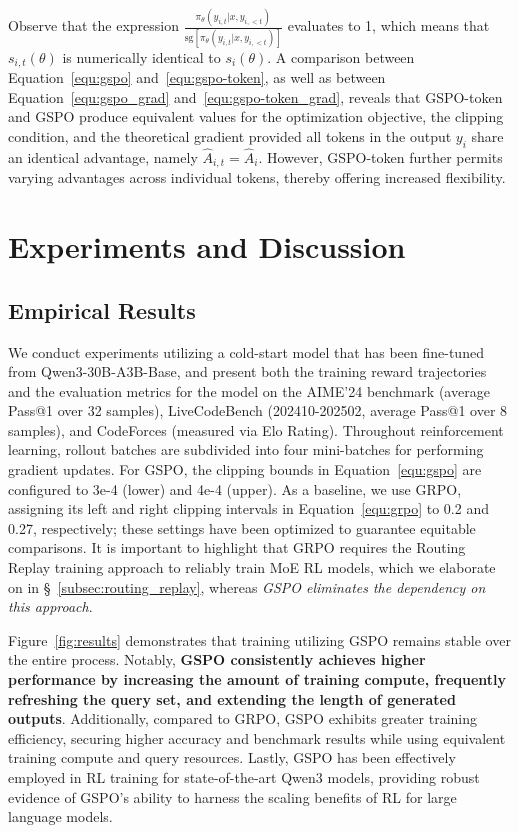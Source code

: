 Observe that the expression $\frac{ \pi_{\theta} (y_{i,t} | x, y_{i,<t}) }{ \mathrm{sg} \left[ \pi_{\theta} (y_{i,t} | x, y_{i,<t}) \right] }$ evaluates to 1, which means that $s_{i,t}(\theta)$ is numerically identical to $s_{i}(\theta)$. A comparison between Equation~\eqref{equ:gspo} and~\eqref{equ:gspo-token}, as well as between Equation~\eqref{equ:gspo_grad} and~\eqref{equ:gspo-token_grad}, reveals that GSPO-token and GSPO produce equivalent values for the optimization objective, the clipping condition, and the theoretical gradient provided all tokens in the output $y_i$ share an identical advantage, namely $\widehat{A}_{i,t} = \widehat{A}_{i}$. However, GSPO-token further permits varying advantages across individual tokens, thereby offering increased flexibility.

\section{Experiments and Discussion}

\subsection{Empirical Results}

We conduct experiments utilizing a cold-start model that has been fine-tuned from Qwen3-30B-A3B-Base, and present both the training reward trajectories and the evaluation metrics for the model on the AIME'24 benchmark (average Pass@1 over 32 samples), LiveCodeBench (202410-202502, average Pass@1 over 8 samples), and CodeForces (measured via Elo Rating). Throughout reinforcement learning, rollout batches are subdivided into four mini-batches for performing gradient updates. For GSPO, the clipping bounds in Equation~\eqref{equ:gspo} are configured to 3e-4 (lower) and 4e-4 (upper). As a baseline, we use GRPO, assigning its left and right clipping intervals in Equation~\eqref{equ:grpo} to 0.2 and 0.27, respectively; these settings have been optimized to guarantee equitable comparisons. It is important to highlight that GRPO requires the Routing Replay training approach to reliably train MoE RL models, which we elaborate on in \S~\ref{subsec:routing_replay}, whereas \textit{GSPO eliminates the dependency on this approach}.

Figure~\ref{fig:results} demonstrates that training utilizing GSPO remains stable over the entire process. Notably, \textbf{GSPO consistently achieves higher performance by increasing the amount of training compute, frequently refreshing the query set, and extending the length of generated outputs}. Additionally, compared to GRPO, GSPO exhibits greater training efficiency, securing higher accuracy and benchmark results while using equivalent training compute and query resources. Lastly, GSPO has been effectively employed in RL training for state-of-the-art Qwen3 models, providing robust evidence of GSPO’s ability to harness the scaling benefits of RL for large language models.

